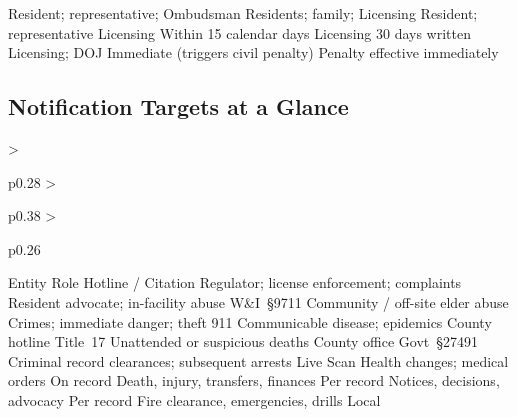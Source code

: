 \begin{cheattablefour}
     {\noticeEvictThirty}
     {}
     {Resident; representative; Ombudsman}
     {\noticeEvictThree}
     {}
     {Residents; family; Licensing}
     {\noticeClosure}
     {}
     {Resident; representative}
     {\noticeRate}
     {}
     {Licensing}
     {Within 15 calendar days}
     {}
     {Licensing}
     {30 days written}
     {}
     {Licensing; DOJ}
     {Immediate}
     {}
     {(triggers civil penalty)}
     {Penalty effective immediately}
     {}
\end{cheattablefour}

\subsection{Notification Targets at a Glance}
\begin{cheattablethree}
  {>{\raggedright\arraybackslash}p{0.28\linewidth}
   >{\raggedright\arraybackslash}p{0.38\linewidth}
   >{\raggedright\arraybackslash}p{0.26\linewidth}}
  {Entity}
  {Role}
  {Hotline / Citation}
    {Regulator; license enforcement; complaints}
    {\ccldComplaint \hfill {}}
    {Resident advocate; in-facility abuse}
    {\ombudsmanCRISIS \hfill W\&I~§9711}
    {Community / off-site elder abuse}
    {\apsHotline \hfill {}}
    {Crimes; immediate danger; theft}
    {911 \hfill {}}
    {Communicable disease; epidemics}
    {County hotline \hfill Title~17}
    {Unattended or suspicious deaths}
    {County office \hfill Govt~§27491}
    {Criminal record clearances; subsequent arrests}
    {Live Scan \hfill {}}
    {Health changes; medical orders}
    {On record \hfill {}}
    {Death, injury, transfers, finances}
    {Per record \hfill {}}
    {Notices, decisions, advocacy}
    {Per record \hfill {}}
    {Fire clearance, emergencies, drills}
    {Local \hfill {}}
\end{cheattablethree}

